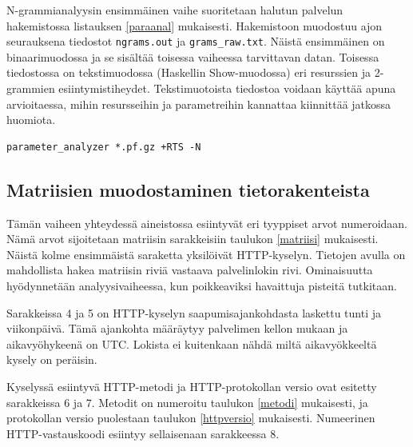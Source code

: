 N-grammianalyysin ensimmäinen vaihe suoritetaan halutun
palvelun hakemistossa listauksen \ref{paraanal} mukaisesti.
Hakemistoon muodostuu ajon seurauksena tiedostot \texttt{ngrams.out}
ja \texttt{grams\_raw.txt}. Näistä ensimmäinen on binaarimuodossa ja
se sisältää toisessa vaiheessa tarvittavan datan. 
Toisessa tiedostossa on tekstimuodossa (Haskellin
Show-muodossa) eri resurssien ja 2-grammien
esiintymistiheydet. Tekstimuotoista tiedostoa voidaan käyttää apuna
arvioitaessa, mihin resursseihin ja parametreihin kannattaa kiinnittää
jatkossa huomiota.

\begin{lstlisting}[language=bashshell,aboveskip=1cm,label=paraanal,caption=N-grammianalyysin
  ensimmäinen vaihe.]
parameter_analyzer *.pf.gz +RTS -N
\end{lstlisting} 

\subsection{Matriisien muodostaminen tietorakenteista}

Tämän vaiheen yhteydessä aineistossa esiintyvät eri tyyppiset arvot
numeroidaan. Nämä arvot sijoitetaan matriisin sarakkeisiin taulukon
\ref{matriisi} mukaisesti.
Näistä kolme ensimmäistä saraketta yksilöivät HTTP-kyselyn. 
Tietojen avulla on mahdollista hakea matriisin riviä vastaava
palvelinlokin rivi. Ominaisuutta hyödynnetään analyysivaiheessa, kun
poikkeaviksi havaittuja pisteitä tutkitaan. 

Sarakkeissa 4 ja 5 on HTTP-kyselyn saapumisajankohdasta laskettu tunti ja viikonpäivä. 
Tämä ajankohta määräytyy palvelimen kellon mukaan ja aikavyöhykeenä on UTC. Lokista ei kuitenkaan
nähdä miltä aikavyökkeeltä kysely on peräisin.

Kyselyssä esiintyvä HTTP-metodi ja HTTP-protokollan versio ovat
esitetty sarakkeissa 6 ja 7. Metodit on numeroitu taulukon
\ref{metodi} mukaisesti, ja protokollan versio puolestaan taulukon
\ref{httpversio} mukaisesti. Numeerinen HTTP-vastauskoodi esiintyy
sellaisenaan sarakkeessa 8.

